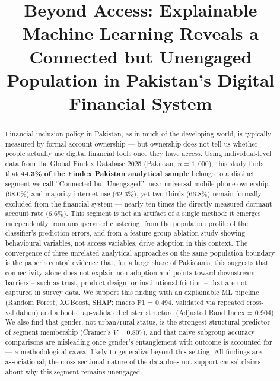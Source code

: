 \documentclass[conference]{IEEEtran}
\begin{document}
\title{Beyond Access: Explainable Machine Learning Reveals a Connected but Unengaged Population in Pakistan's Digital Financial System}

\author{
\and
{}
}

\maketitle
\begin{abstract}
Financial inclusion policy in Pakistan, as in much of the developing world,
is typically measured by formal account ownership --- but ownership does
not tell us whether people actually use digital financial tools once they
have access. Using individual-level data from the Global Findex Database
2025 (Pakistan, $n=1{,}000$), this study finds that \textbf{44.3\% of the
Findex Pakistan analytical sample} belongs to a distinct segment we call ``Connected but
Unengaged'': near-universal mobile phone ownership (98.0\%) and majority
internet use (62.3\%), yet two-thirds (66.8\%) remain formally excluded
from the financial system --- nearly ten times the directly-measured
dormant-account rate (6.6\%). This segment is not an artifact of a single
method: it emerges independently from unsupervised clustering, from the
population profile of the classifier's prediction errors, and from a
feature-group ablation study showing behavioural variables, not access
variables, drive adoption in this context. The convergence of three
unrelated analytical approaches on the same population boundary is the
paper's central evidence that, for a large share of Pakistanis, this suggests
that connectivity alone does not explain non-adoption and points toward downstream
barriers -- such as trust, product design, or institutional friction -- that are not captured in survey data. We support this finding with an
explainable ML pipeline (Random Forest, XGBoost, SHAP; macro F1 = 0.494,
validated via repeated cross-validation) and a bootstrap-validated cluster
structure (Adjusted Rand Index = 0.904). We also find that gender, not
urban/rural status, is the strongest structural predictor of segment
membership (Cramer's $V = 0.807$), and that naive subgroup accuracy
comparisons are misleading once gender's entanglement with outcome is
accounted for --- a methodological caveat likely to generalize beyond this
setting. All findings are associational; the cross-sectional nature of the
data does not support causal claims about why this segment remains
unengaged.
\end{abstract}
\end{document}
